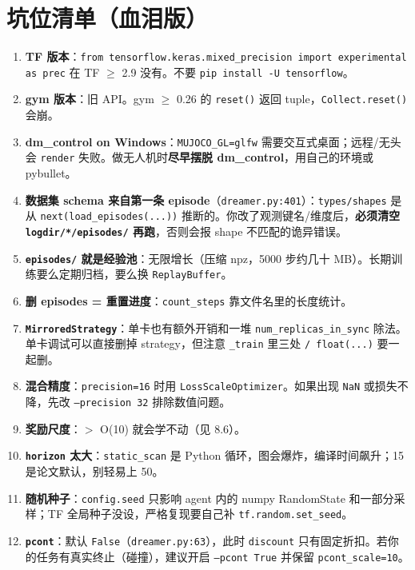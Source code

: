 \documentclass[11pt]{ctexart}
\begin{document}
\section{坑位清单（血泪版）}
\begin{enumerate}
  \item \textbf{TF 版本}：\texttt{from tensorflow.keras.mixed\_precision import experimental as prec} 在 TF $\geq$ 2.9 没有。不要 \texttt{pip install -U tensorflow}。
  \item \textbf{gym 版本}：旧 API。gym $\geq$ 0.26 的 \texttt{reset()} 返回 tuple，\texttt{Collect.reset()} 会崩。
  \item \textbf{dm\_control on Windows}：\texttt{MUJOCO\_GL=glfw} 需要交互式桌面；远程/无头会 \texttt{render} 失败。做无人机时\textbf{尽早摆脱 dm\_control}，用自己的环境或 pybullet。
  \item \textbf{数据集 schema 来自第一条 episode}（\texttt{dreamer.py:401}）：\texttt{types/shapes} 是从 \texttt{next(load\_episodes(...))} 推断的。你改了观测键名/维度后，\textbf{必须清空 \texttt{logdir/*/episodes/} 再跑}，否则会报 shape 不匹配的诡异错误。
  \item \textbf{\texttt{episodes/} 就是经验池}：无限增长（压缩 npz，5000 步约几十 MB）。长期训练要么定期归档，要么换 \texttt{ReplayBuffer}。
  \item \textbf{删 episodes = 重置进度}：\texttt{count\_steps} 靠文件名里的长度统计。
  \item \textbf{\texttt{MirroredStrategy}}：单卡也有额外开销和一堆 \texttt{num\_replicas\_in\_sync} 除法。单卡调试可以直接删掉 strategy，但注意 \texttt{\_train} 里三处 \texttt{/ float(...)} 要一起删。
  \item \textbf{混合精度}：\texttt{precision=16} 时用 \texttt{LossScaleOptimizer}。如果出现 \texttt{NaN} 或损失不降，先改 \texttt{--precision 32} 排除数值问题。
  \item \textbf{奖励尺度}：$>$ O(10) 就会学不动（见 8.6）。
  \item \textbf{\texttt{horizon} 太大}：\texttt{static\_scan} 是 Python 循环，图会爆炸，编译时间飙升；15 是论文默认，别轻易上 50。
  \item \textbf{随机种子}：\texttt{config.seed} 只影响 agent 内的 numpy RandomState 和一部分采样；TF 全局种子没设，严格复现要自己补 \texttt{tf.random.set\_seed}。
  \item \textbf{\texttt{pcont}}：默认 \texttt{False}（\texttt{dreamer.py:63}），此时 \texttt{discount} 只有固定折扣。若你的任务有真实终止（碰撞），建议开启 \texttt{--pcont True} 并保留 \texttt{pcont\_scale=10}。
\end{enumerate}
\end{document}
